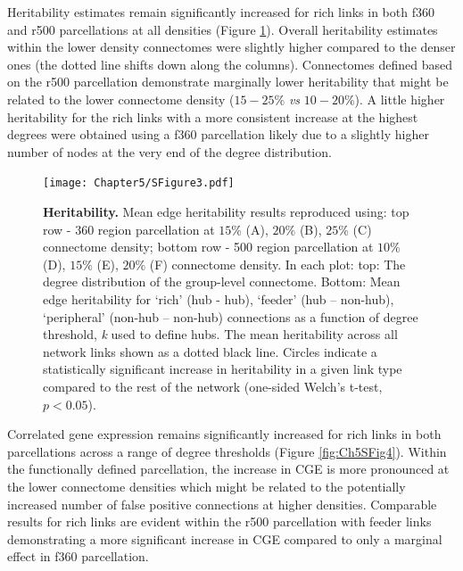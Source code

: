 \clearpage
Heritability estimates remain significantly increased for rich links in both f360 and r500 parcellations at all densities (Figure \ref{fig:Ch5SFig3}). Overall heritability estimates within the lower density connectomes were slightly higher compared to the denser ones (the dotted line shifts down along the columns). Connectomes defined based on the r500 parcellation demonstrate marginally lower heritability that might be related to the lower connectome density ($15-25\%$ \textit{vs} $10-20\%$). A little higher heritability for the rich links with a more consistent increase at the highest degrees were obtained using a f360 parcellation likely due to a slightly higher number of nodes at the very end of the degree distribution. 

\begin{figure}[h!]
\begin{center}
\texttt{[image: Chapter5/SFigure3.pdf]}%
\end{center}
\caption{\textbf{Heritability.} 
Mean edge heritability results reproduced using: top row - 360 region parcellation at $15\%$ (A), $20\%$ (B), $25\%$ (C) connectome density; bottom row - 500 region parcellation at $10\%$ (D), $15\%$ (E), $20\%$ (F) connectome density. In each plot: top: The degree distribution of the group-level connectome. Bottom: Mean edge heritability for `rich' (hub - hub), `feeder' (hub – non-hub), `peripheral' (non-hub – non-hub) connections as a function of degree threshold, \textit{k} used to define hubs. The mean heritability across all network links shown as a dotted black line. Circles indicate a statistically significant increase in heritability in a given link type compared to the rest of the network (one-sided Welch's t-test, $p < 0.05$).}
\label{fig:Ch5SFig3}
\end{figure}

\clearpage
Correlated gene expression remains significantly increased for rich links in both parcellations across a range of degree thresholds (Figure \ref{fig:Ch5SFig4}). Within the functionally defined parcellation, the increase in CGE is more pronounced at the lower connectome densities which might be related to the potentially increased number of false positive connections at higher densities. Comparable results for rich links are evident within the r500 parcellation with feeder links demonstrating a more significant increase in CGE compared to only a marginal effect in f360 parcellation. 

